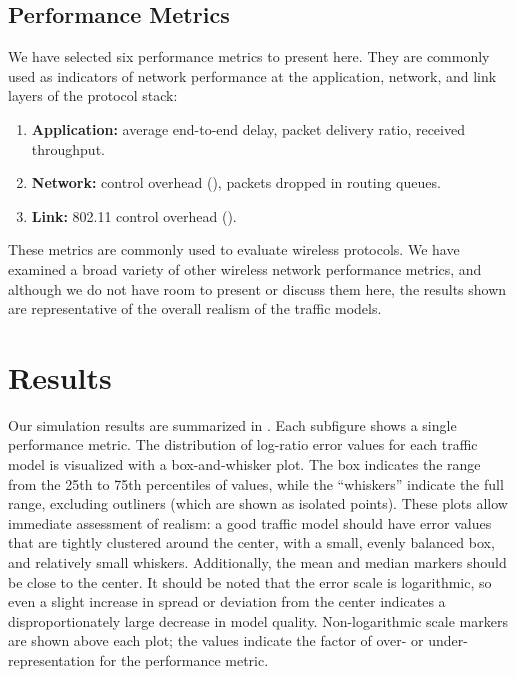 \documentclass[twocolumn,final]{svjour3}
\begin{document}
\subsection{Performance Metrics}
\label{sec:performance-metrics}

We have selected six performance metrics to present here. They are commonly used as indicators of network performance at the application, network, and link layers of the protocol stack:
\begin{enumerate}
\setlength{\itemsep}{0em}
\item \textbf{Application:} average end-to-end delay, packet delivery ratio, received throughput.
\item \textbf{Network:}  control overhead (), packets dropped in routing queues.
\item \textbf{Link:} 802.11 control overhead ().
\end{enumerate}
These metrics are commonly used to evaluate wireless protocols. We have examined a broad variety of other wireless network performance metrics, and although we do not have room to present or discuss them here, the results shown are representative of the overall realism of the traffic models.

\section{Results}
\label{sec:results}



Our simulation results are summarized in . Each subfigure shows a single performance metric. The distribution of log-ratio error values for each traffic model is visualized with a box-and-whisker plot. The box indicates the range from the 25th to 75th percentiles of values, while the ``whiskers'' indicate the full range, excluding outliners (which are shown as isolated points). These plots allow immediate assessment of realism: a good traffic model should have error values that are tightly clustered around the center, with a small, evenly balanced box, and relatively small whiskers. Additionally, the mean and median markers should be close to the center. It should be noted that the error scale is logarithmic, so even a slight increase in spread or deviation from the center indicates a disproportionately large decrease in model quality. Non-logarithmic scale markers are shown above each plot; the values indicate the factor of over- or under-representation for the performance metric.
\end{document}
